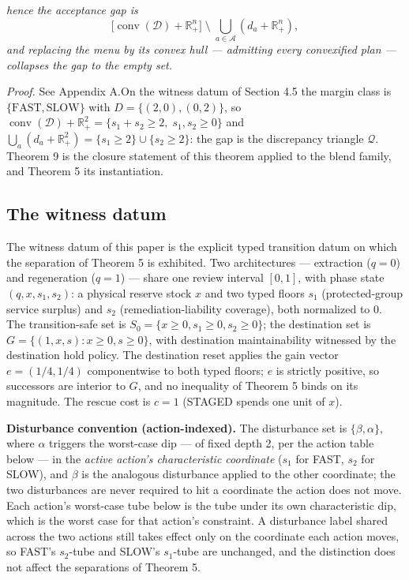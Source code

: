 \documentclass[3p,11pt]{elsarticle}
\begin{document}
\emph{hence the acceptance gap is}
\[
\bigl[\operatorname{conv}(\mathcal{D}) + \mathbb{R}^n_+\bigr]
\;\setminus\;
\bigcup_{a \in \mathcal{A}} (d_a + \mathbb{R}^n_+),
\]
\emph{and replacing the menu by its convex hull --- admitting every
convexified plan --- collapses the gap to the empty set.}

\emph{Proof.} See Appendix A.On the witness datum of Section 4.5 the margin class is
\(\{\mathrm{FAST}, \mathrm{SLOW}\}\) with \(D = \{(2,0), (0,2)\}\), so
\(\operatorname{conv}(\mathcal{D}) + \mathbb{R}^2_+ = \{ s_1 + s_2 \ge 2,\; s_1,
s_2 \ge 0\}\) and
\(\bigcup_a (d_a + \mathbb{R}^2_+) = \{ s_1 \ge 2 \} \cup \{ s_2 \ge 2
\}\): the gap is the discrepancy triangle \(\mathcal{Q}\). Theorem 9 is
the closure statement of this theorem applied to the blend family, and
Theorem 5 its instantiation.

\subsection{The witness datum}\label{the-witness-datum}

The witness datum of this paper is the explicit typed transition datum
on which the separation of Theorem 5 is exhibited. Two architectures ---
extraction (\(q = 0\)) and regeneration (\(q = 1\)) --- share one review
interval \([0,1]\), with phase state \((q, x, s_1, s_2)\): a physical
reserve stock \(x\) and two typed floors \(s_1\) (protected-group
service surplus) and \(s_2\) (remediation-liability coverage), both
normalized to \(0\). The transition-safe set is
\(S_0 = \{ x \ge 0, s_1 \ge 0, s_2 \ge 0 \}\); the destination set is
\(G = \{ (1, x, s) : x \ge 0, s \ge 0 \}\), with destination
maintainability witnessed by the destination hold policy. The destination reset applies the gain vector \(e = (1/4, 1/4)\)
componentwise to both typed floors; \(e\) is strictly positive, so successors are interior to \(G\), and no inequality of Theorem 5 binds on its magnitude. The rescue cost is \(c = 1\) (STAGED spends one
unit of \(x\)).

\textbf{Disturbance convention (action-indexed).} The disturbance set is
\(\{\beta, \alpha\}\), where \(\alpha\) triggers the worst-case dip ---
of fixed depth 2, per the action table below --- in the \emph{active
action's characteristic coordinate} (\(s_1\) for FAST, \(s_2\) for
SLOW), and \(\beta\) is the analogous disturbance applied to the other
coordinate; the two disturbances are never required to hit a coordinate
the action does not move. Each action's worst-case tube below is the
tube under its own characteristic dip, which is the worst case for that
action's constraint. A disturbance label shared across the two actions
still takes effect only on the coordinate each action moves, so FAST's
\(s_2\)-tube and SLOW's \(s_1\)-tube are unchanged, and the distinction
does not affect the separations of Theorem 5.
\end{document}
